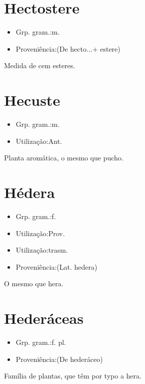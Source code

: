 \documentclass{article}
\begin{document}
\section{Hectostere}
\begin{itemize}
\item {Grp. gram.:m.}
\end{itemize}
\begin{itemize}
\item {Proveniência:(De \textunderscore hecto...\textunderscore  + \textunderscore estere\textunderscore )}
\end{itemize}
Medida de cem esteres.
\section{Hecuste}
\begin{itemize}
\item {Grp. gram.:m.}
\end{itemize}
\begin{itemize}
\item {Utilização:Ant.}
\end{itemize}
Planta aromática, o mesmo que \textunderscore pucho\textunderscore .
\section{Hédera}
\begin{itemize}
\item {Grp. gram.:f.}
\end{itemize}
\begin{itemize}
\item {Utilização:Prov.}
\end{itemize}
\begin{itemize}
\item {Utilização:trasm.}
\end{itemize}
\begin{itemize}
\item {Proveniência:(Lat. \textunderscore hedera\textunderscore )}
\end{itemize}
O mesmo que \textunderscore hera\textunderscore .
\section{Hederáceas}
\begin{itemize}
\item {Grp. gram.:f. pl.}
\end{itemize}
\begin{itemize}
\item {Proveniência:(De \textunderscore hederáceo\textunderscore )}
\end{itemize}
Família de plantas, que têm por typo a hera.
\end{document}
